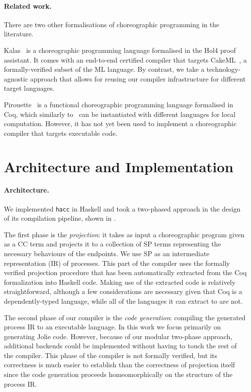 \documentclass[runningheads]{llncs}
\newcommand{\toolname}{\texttt{hacc}}
\begin{document}
\paragraph*{Related work.}

There are two other formalisations of choreographic programming in the literature.

Kalas~\cite{PGSN22} is a choreographic programming language formalised in the Hol4 proof assistant.
It comes with an end-to-end certified compiler that targets CakeML~\cite{MO12}, a formally-verified subset of the ML language.
By contrast, we take a technology-agnostic approach that allows for reusing our compiler infrastructure for different target languages.

Pirouette~\cite{HG22} is a functional choreographic programming language formalised in Coq, which similarly to~\cite{CMP21} can be instantiated with different languages for local computation.
However, it has not yet been used to implement a choreographic compiler that targets executable code.

\section{Architecture and Implementation}
\label{sec:arch}

\paragraph*{Architecture.}

We implemented \toolname{} in Haskell and took a two-phased approach in the design of its compilation pipeline, shown in .

The first phase is the \textit{projection}: it takes as input a choreographic program given as a CC term and projects it to a collection of SP terms representing the necessary behaviours of the endpoints.
We use SP as an intermediate representation (IR) of processes.
This part of the compiler uses the formally verified projection procedure that has been automatically extracted from the Coq formalization into Haskell code.
Making use of the extracted code is relatively straightforward, although a few considerations are necessary given that Coq is a dependently-typed language, while all of the languages it can extract to are not.

The second phase of our compiler is the \textit{code generation}: compiling the generated process IR to an executable language.
In this work we focus primarily on generating Jolie code.
However, because of our modular two-phase approach, additional backends could be implemented without having to touch the rest of the compiler.
This phase of the compiler is not formally verified, but its correctness is much easier to establish than the correctness of projection itself since the code generation proceeds homeomorphically  on the structure of the process IR.
\end{document}
